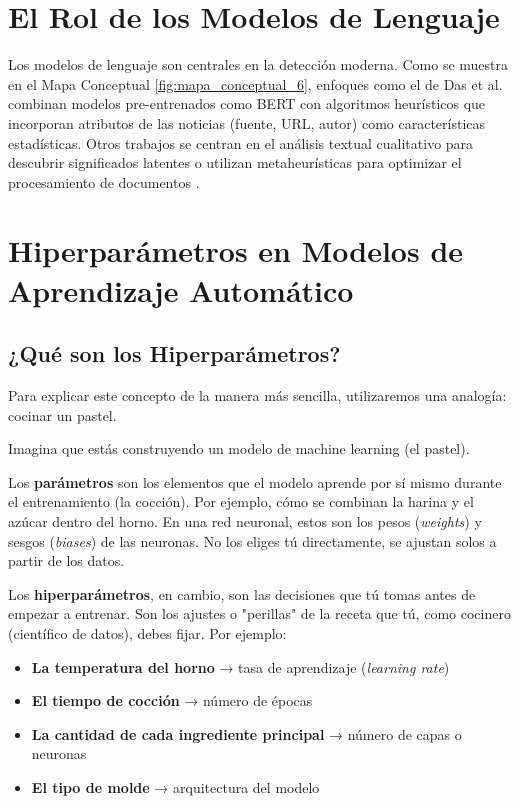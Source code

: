 \section{El Rol de los Modelos de Lenguaje}
Los modelos de lenguaje son centrales en la detección moderna. Como se muestra en el Mapa Conceptual \ref{fig:mapa_conceptual_6}, enfoques como el de Das et al. \cite{das2022heuristic} combinan modelos pre-entrenados como BERT con algoritmos heurísticos que incorporan atributos de las noticias (fuente, URL, autor) como características estadísticas. Otros trabajos se centran en el análisis textual cualitativo para descubrir significados latentes \cite{ali2020posttruth} o utilizan metaheurísticas para optimizar el procesamiento de documentos \cite{aqil2021modeling}.

\section{Hiperparámetros en Modelos de Aprendizaje Automático}
\label{sec:hiperparametros}

\subsection{¿Qué son los Hiperparámetros?}

Para explicar este concepto de la manera más sencilla, utilizaremos una analogía: cocinar un pastel.

Imagina que estás construyendo un modelo de machine learning (el pastel).

Los \textbf{parámetros} son los elementos que el modelo aprende por sí mismo durante el entrenamiento (la cocción). Por ejemplo, cómo se combinan la harina y el azúcar dentro del horno. En una red neuronal, estos son los pesos (\textit{weights}) y sesgos (\textit{biases}) de las neuronas. No los eliges tú directamente, se ajustan solos a partir de los datos.

Los \textbf{hiperparámetros}, en cambio, son las decisiones que tú tomas antes de empezar a entrenar. Son los ajustes o "perillas" de la receta que tú, como cocinero (científico de datos), debes fijar. Por ejemplo:

\begin{itemize}
    \item \textbf{La temperatura del horno} → tasa de aprendizaje (\textit{learning rate})
    \item \textbf{El tiempo de cocción} → número de épocas
    \item \textbf{La cantidad de cada ingrediente principal} → número de capas o neuronas
    \item \textbf{El tipo de molde} → arquitectura del modelo
\end{itemize}

